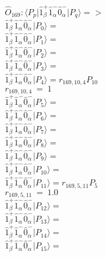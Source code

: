 \documentclass[14pt]{article}
\begin{document}
    $\hat{O}_{169}:  \langle{P_p}\vert \hat{1}_{\beta}^{+}\hat{1}_{\alpha}^{-}\hat{0}_{\alpha}^{-} \vert{P_q}\rangle => $ \\ 
    $ \hat{1}_{\beta}^{+}\hat{1}_{\alpha}^{-}\hat{0}_{\alpha}^{-} \vert{P_{0}}\rangle =  $ \\ 
    $ \hat{1}_{\beta}^{+}\hat{1}_{\alpha}^{-}\hat{0}_{\alpha}^{-} \vert{P_{1}}\rangle =  $ \\ 
    $ \hat{1}_{\beta}^{+}\hat{1}_{\alpha}^{-}\hat{0}_{\alpha}^{-} \vert{P_{2}}\rangle =  $ \\ 
    $ \hat{1}_{\beta}^{+}\hat{1}_{\alpha}^{-}\hat{0}_{\alpha}^{-} \vert{P_{3}}\rangle =  $ \\ 
    $ \hat{1}_{\beta}^{+}\hat{1}_{\alpha}^{-}\hat{0}_{\alpha}^{-} \vert{P_{4}}\rangle = {r}_{169,10,4}P_{10} $ \\ 
    ${r}_{169,10,4}\ =\ 1 $ \\ 
    $ \hat{1}_{\beta}^{+}\hat{1}_{\alpha}^{-}\hat{0}_{\alpha}^{-} \vert{P_{5}}\rangle =  $ \\ 
    $ \hat{1}_{\beta}^{+}\hat{1}_{\alpha}^{-}\hat{0}_{\alpha}^{-} \vert{P_{6}}\rangle =  $ \\ 
    $ \hat{1}_{\beta}^{+}\hat{1}_{\alpha}^{-}\hat{0}_{\alpha}^{-} \vert{P_{7}}\rangle =  $ \\ 
    $ \hat{1}_{\beta}^{+}\hat{1}_{\alpha}^{-}\hat{0}_{\alpha}^{-} \vert{P_{8}}\rangle =  $ \\ 
    $ \hat{1}_{\beta}^{+}\hat{1}_{\alpha}^{-}\hat{0}_{\alpha}^{-} \vert{P_{9}}\rangle =  $ \\ 
    $ \hat{1}_{\beta}^{+}\hat{1}_{\alpha}^{-}\hat{0}_{\alpha}^{-} \vert{P_{10}}\rangle =  $ \\ 
    $ \hat{1}_{\beta}^{+}\hat{1}_{\alpha}^{-}\hat{0}_{\alpha}^{-} \vert{P_{11}}\rangle = {r}_{169,5,11}P_{5} $ \\ 
    ${r}_{169,5,11}\ =\ 1.0 $ \\ 
    $ \hat{1}_{\beta}^{+}\hat{1}_{\alpha}^{-}\hat{0}_{\alpha}^{-} \vert{P_{12}}\rangle =  $ \\ 
    $ \hat{1}_{\beta}^{+}\hat{1}_{\alpha}^{-}\hat{0}_{\alpha}^{-} \vert{P_{13}}\rangle =  $ \\ 
    $ \hat{1}_{\beta}^{+}\hat{1}_{\alpha}^{-}\hat{0}_{\alpha}^{-} \vert{P_{14}}\rangle =  $ \\ 
    $ \hat{1}_{\beta}^{+}\hat{1}_{\alpha}^{-}\hat{0}_{\alpha}^{-} \vert{P_{15}}\rangle =  $ \\ 
    
\end{document}
